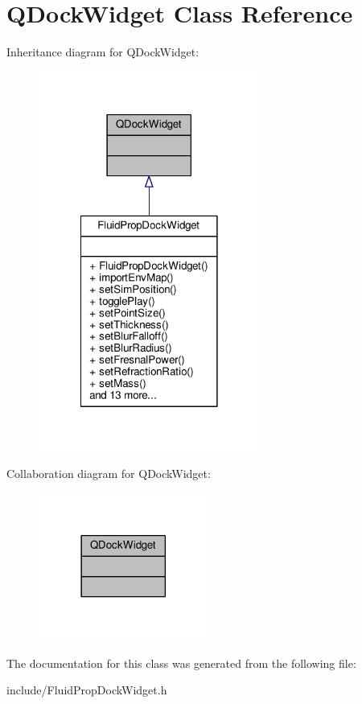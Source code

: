 \hypertarget{class_q_dock_widget}{\section{Q\-Dock\-Widget Class Reference}
\label{class_q_dock_widget}
}


Inheritance diagram for Q\-Dock\-Widget\-:
\nopagebreak
\begin{figure}[H]
\begin{center}
\leavevmode
\includegraphics[width=206pt]{class_q_dock_widget__inherit__graph}
\end{center}
\end{figure}


Collaboration diagram for Q\-Dock\-Widget\-:
\nopagebreak
\begin{figure}[H]
\begin{center}
\leavevmode
\includegraphics[width=158pt]{class_q_dock_widget__coll__graph}
\end{center}
\end{figure}


The documentation for this class was generated from the following file\-:\begin{DoxyCompactItemize}
\item 
include/Fluid\-Prop\-Dock\-Widget.\-h\end{DoxyCompactItemize}
